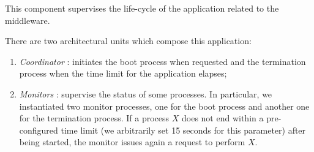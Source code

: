 
This component supervises the life-cycle of the
application related to the middleware.

There are two architectural units which compose this application:

\begin{enumerate}
\item \textit{Coordinator} : initiates the boot process when requested and the
  termination process when the time limit for the application elapses;
\item \textit{Monitors} : supervise the status of some processes. In
  particular, we instantiated two monitor processes, one for the boot process
  and another one for the termination process. If a process $X$ does not end
  within a pre-configured time limit (we arbitrarily set 15 seconds for this
  parameter) after being started, the monitor issues again a request to
  perform $X$.
\end{enumerate}
